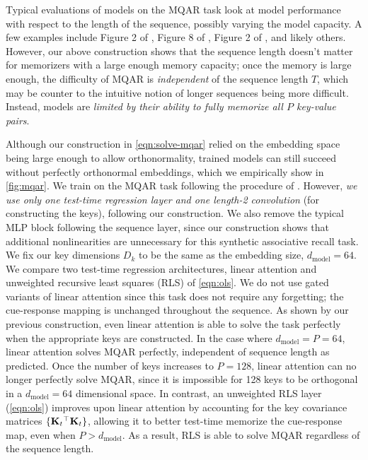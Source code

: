 \documentclass[notitlepage, 11pt]{article}
\newcommand*{\dkey}{{D_k}}
\begin{document}
Typical evaluations of models on the MQAR task look at model performance with respect to the length of the sequence, possibly varying the model capacity. A few examples include Figure 2 of \citet{Arora2023ZoologyMeasuringImproving}, Figure 8 of \citet{Dao2024TransformersAreSSMs}, Figure 2 of \citet{Yang2024ParallelizingLinearTransformers}, and likely others.
However, our above construction shows that the sequence length doesn't matter for memorizers with a large enough memory capacity; once the memory is large enough, the difficulty of MQAR is \emph{independent} of the sequence length $T$, which may be counter to the intuitive notion of longer sequences being more difficult.
Instead, models are \emph{limited by their ability to fully memorize all $P$ key-value pairs}.

Although our construction in \autoref{eqn:solve-mqar} relied on the embedding space being large enough to allow orthonormality, trained models can still succeed without perfectly orthonormal embeddings, which we empirically show in \autoref{fig:mqar}.
We train on the MQAR task following the procedure of \citep{Arora2023ZoologyMeasuringImproving}.
However, \emph{we use only one test-time regression layer and one length-2 convolution} (for constructing the keys), following our construction.
We also remove the typical MLP block following the sequence layer, since our construction shows that additional nonlinearities are unnecessary for this synthetic associative recall task.
We fix our key dimensions $\dkey$ to be the same as the embedding size, $d_{\text{model}} = 64$.
We compare two test-time regression architectures, linear attention and unweighted recursive least squares (RLS) of \autoref{eqn:ols}.
We do not use gated variants of linear attention since this task does not require any forgetting; the cue-response mapping is unchanged throughout the sequence.
As shown by our previous construction, even linear attention is able to solve the task perfectly when the appropriate keys are constructed.
In the case where $d_{\text{model}} = P=64$, linear attention solves MQAR perfectly, independent of sequence length as predicted.
Once the number of keys increases to $P=128$, linear attention can no longer perfectly solve MQAR, since it is impossible for 128 keys to be orthogonal in a $d_{\text{model}}=64$ dimensional space.
In contrast, an unweighted RLS layer (\autoref{eqn:ols}) improves upon linear attention by accounting for the key covariance matrices $\{\mathbf{K}_t{}^\top\mathbf{K}_t\}$, allowing it to better test-time memorize the cue-response map, even when $P > d_{\text{model}}$.
As a result, RLS is able to solve MQAR regardless of the sequence length.
\end{document}
